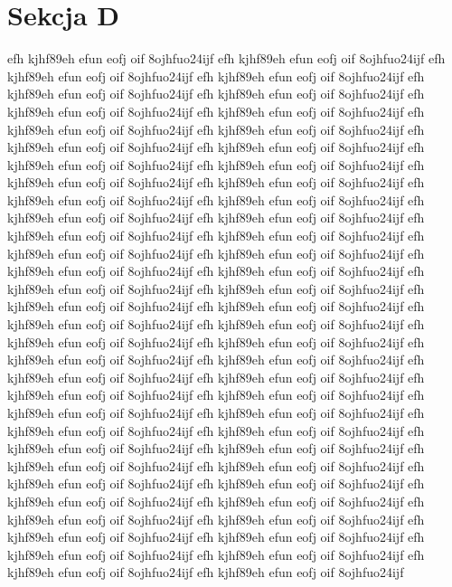 \documentclass[a4paper,12pt]{book} %
\begin{document}
\section{Sekcja D}

efh kjhf89eh efun eofj oif 8ojhfuo24ijf
efh kjhf89eh efun eofj oif 8ojhfuo24ijf
efh kjhf89eh efun eofj oif 8ojhfuo24ijf
efh kjhf89eh efun eofj oif 8ojhfuo24ijf
efh kjhf89eh efun eofj oif 8ojhfuo24ijf
efh kjhf89eh efun eofj oif 8ojhfuo24ijf
efh kjhf89eh efun eofj oif 8ojhfuo24ijf
efh kjhf89eh efun eofj oif 8ojhfuo24ijf
efh kjhf89eh efun eofj oif 8ojhfuo24ijf
efh kjhf89eh efun eofj oif 8ojhfuo24ijf
efh kjhf89eh efun eofj oif 8ojhfuo24ijf
efh kjhf89eh efun eofj oif 8ojhfuo24ijf
efh kjhf89eh efun eofj oif 8ojhfuo24ijf
efh kjhf89eh efun eofj oif 8ojhfuo24ijf
efh kjhf89eh efun eofj oif 8ojhfuo24ijf
efh kjhf89eh efun eofj oif 8ojhfuo24ijf
efh kjhf89eh efun eofj oif 8ojhfuo24ijf
efh kjhf89eh efun eofj oif 8ojhfuo24ijf
efh kjhf89eh efun eofj oif 8ojhfuo24ijf
efh kjhf89eh efun eofj oif 8ojhfuo24ijf
efh kjhf89eh efun eofj oif 8ojhfuo24ijf
efh kjhf89eh efun eofj oif 8ojhfuo24ijf
efh kjhf89eh efun eofj oif 8ojhfuo24ijf
efh kjhf89eh efun eofj oif 8ojhfuo24ijf
efh kjhf89eh efun eofj oif 8ojhfuo24ijf
efh kjhf89eh efun eofj oif 8ojhfuo24ijf
efh kjhf89eh efun eofj oif 8ojhfuo24ijf
efh kjhf89eh efun eofj oif 8ojhfuo24ijf
efh kjhf89eh efun eofj oif 8ojhfuo24ijf
efh kjhf89eh efun eofj oif 8ojhfuo24ijf
efh kjhf89eh efun eofj oif 8ojhfuo24ijf
efh kjhf89eh efun eofj oif 8ojhfuo24ijf
efh kjhf89eh efun eofj oif 8ojhfuo24ijf
efh kjhf89eh efun eofj oif 8ojhfuo24ijf
efh kjhf89eh efun eofj oif 8ojhfuo24ijf
efh kjhf89eh efun eofj oif 8ojhfuo24ijf
efh kjhf89eh efun eofj oif 8ojhfuo24ijf
efh kjhf89eh efun eofj oif 8ojhfuo24ijf
efh kjhf89eh efun eofj oif 8ojhfuo24ijf
efh kjhf89eh efun eofj oif 8ojhfuo24ijf
efh kjhf89eh efun eofj oif 8ojhfuo24ijf
efh kjhf89eh efun eofj oif 8ojhfuo24ijf
efh kjhf89eh efun eofj oif 8ojhfuo24ijf
efh kjhf89eh efun eofj oif 8ojhfuo24ijf
efh kjhf89eh efun eofj oif 8ojhfuo24ijf
efh kjhf89eh efun eofj oif 8ojhfuo24ijf
efh kjhf89eh efun eofj oif 8ojhfuo24ijf
efh kjhf89eh efun eofj oif 8ojhfuo24ijf
efh kjhf89eh efun eofj oif 8ojhfuo24ijf
efh kjhf89eh efun eofj oif 8ojhfuo24ijf
efh kjhf89eh efun eofj oif 8ojhfuo24ijf
efh kjhf89eh efun eofj oif 8ojhfuo24ijf
efh kjhf89eh efun eofj oif 8ojhfuo24ijf
efh kjhf89eh efun eofj oif 8ojhfuo24ijf
efh kjhf89eh efun eofj oif 8ojhfuo24ijf
efh kjhf89eh efun eofj oif 8ojhfuo24ijf
efh kjhf89eh efun eofj oif 8ojhfuo24ijf
efh kjhf89eh efun eofj oif 8ojhfuo24ijf
efh kjhf89eh efun eofj oif 8ojhfuo24ijf
efh kjhf89eh efun eofj oif 8ojhfuo24ijf
\end{document}

